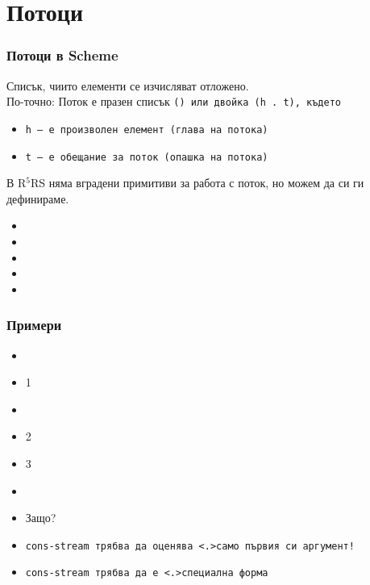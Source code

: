\documentclass[alsotrans,beameroptions={aspectratio=169}]{beamerswitch}
\begin{document}
\section{Потоци}

\begin{frame}
  \frametitle{Потоци в Scheme}

  \begin{definition}[Поток]
    Списък, чиито елементи се изчисляват отложено. \\
    \pause
    По-точно: Поток е празен списък \tt{()} или двойка \tt{(h . t)}, където
    \begin{itemize}
    \item \tt h --- е произволен елемент (глава на потока)
    \item \tt t --- е \alert{обещание} за поток (опашка на потока)
    \end{itemize}
  \end{definition}
  \pause
  В R$^5$RS няма вградени примитиви за работа с поток, но можем да си ги дефинираме.
  \pause
  \begin{itemize}[<+->]
  \item {}
  \item {}
  \item {}
  \item {}
  \item {}
  \end{itemize}
\end{frame}

\begin{frame}[fragile]
  \frametitle{Примери}

  \begin{itemize}[<+->]
  \item {}
  \item {}1
  \item {}
  \item {}2
  \item {}3
  \item {}
  \item<+-| alert@+>Защо?
  \item \tt{cons-stream} трябва да оценява \alert<.>{само първия си аргумент}!
  \item \tt{cons-stream} трябва да е \alert<.>{специална форма}
  \end{itemize}
\end{frame}
\end{document}
